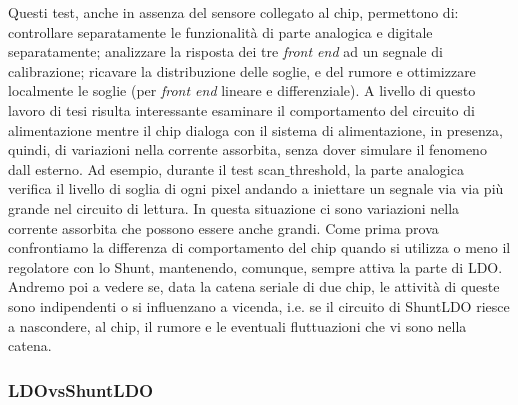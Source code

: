 Questi test, anche in assenza del sensore collegato al chip, permettono di: controllare separatamente le funzionalità di parte analogica e digitale separatamente; analizzare la risposta dei tre \textit{front end} ad un segnale di calibrazione; ricavare la distribuzione delle soglie, e del rumore e ottimizzare localmente le soglie (per \textit{front end} lineare e differenziale). 
A livello di questo lavoro di tesi risulta interessante esaminare il comportamento del circuito di alimentazione mentre il chip dialoga con il sistema di alimentazione, in presenza, quindi, di variazioni nella corrente assorbita, senza dover simulare il fenomeno dall esterno. 
Ad esempio, durante il test scan$\_$threshold, la parte analogica verifica il livello di soglia di ogni pixel andando a iniettare un segnale via via più grande nel circuito di lettura.
In questa situazione ci sono variazioni nella corrente assorbita che possono essere anche grandi. 
Come prima prova confrontiamo la differenza di comportamento del chip quando si utilizza o meno il regolatore con lo Shunt, mantenendo, comunque, sempre attiva la parte di LDO.
Andremo poi a vedere se, data la catena seriale di due chip, le attività di queste sono indipendenti o si influenzano a vicenda, i.e. se il circuito di ShuntLDO riesce a nascondere, al chip, il rumore e le eventuali fluttuazioni che vi sono nella catena.

\subsubsection{LDOvsShuntLDO}

